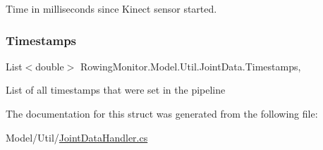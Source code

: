 Time in milliseconds since Kinect sensor started. 

\mbox{\label{struct_rowing_monitor_1_1_model_1_1_util_1_1_joint_data_a98bf571ea92c7f9b8e197062f17ddc27}} 
\subsubsection{\texorpdfstring{Timestamps}{Timestamps}}
{\footnotesize\ttfamily List$<$double$>$ Rowing\+Monitor.\+Model.\+Util.\+Joint\+Data.\+Timestamps\hspace{0.3cm}{\ttfamily [get]}, {\ttfamily [set]}}



List of all timestamps that were set in the pipeline 



The documentation for this struct was generated from the following file\+:\begin{DoxyCompactItemize}
\item 
Model/\+Util/\hyperlink{_joint_data_handler_8cs}{Joint\+Data\+Handler.\+cs}\end{DoxyCompactItemize}
